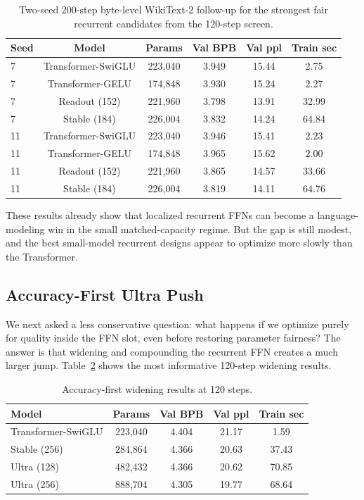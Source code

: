 \documentclass[11pt]{article}
\begin{document}
\begin{table}[t]
  \centering
  \small
  \caption{Two-seed 200-step byte-level WikiText-2 follow-up for the strongest
  fair recurrent candidates from the 120-step screen.}
  \label{tab:pilot200}
  \begin{tabular}{lccccc}
    \toprule
    Seed & Model & Params & Val BPB & Val ppl & Train sec \\
    \midrule
    7 & Transformer-SwiGLU & 223,040 & 3.949 & 15.44 & 2.75 \\
    7 & Transformer-GELU & 174,848 & 3.930 & 15.24 & 2.27 \\
    7 & Readout (152) & 221,960 & 3.798 & 13.91 & 32.99 \\
    7 & Stable (184) & 226,004 & 3.832 & 14.24 & 64.84 \\
    11 & Transformer-SwiGLU & 223,040 & 3.946 & 15.41 & 2.23 \\
    11 & Transformer-GELU & 174,848 & 3.965 & 15.62 & 2.00 \\
    11 & Readout (152) & 221,960 & 3.865 & 14.57 & 33.66 \\
    11 & Stable (184) & 226,004 & 3.819 & 14.11 & 64.76 \\
    \bottomrule
  \end{tabular}
\end{table}

These results already show that localized recurrent FFNs can become a
language-modeling win in the small matched-capacity regime. But the gap is
still modest, and the best small-model recurrent designs appear to optimize
more slowly than the Transformer.

\subsection{Accuracy-First Ultra Push}
We next asked a less conservative question: what happens if we optimize purely
for quality inside the FFN slot, even before restoring parameter fairness? The
answer is that widening and compounding the recurrent FFN creates a much larger
jump. Table~\ref{tab:ultra120} shows the most informative 120-step widening
results.

\begin{table}[t]
  \centering
  \caption{Accuracy-first widening results at 120 steps.}
  \label{tab:ultra120}
  \begin{tabular}{lcccc}
    \toprule
    Model & Params & Val BPB & Val ppl & Train sec \\
    \midrule
    Transformer-SwiGLU & 223,040 & 4.404 & 21.17 & 1.59 \\
    Stable (256) & 284,864 & 4.366 & 20.63 & 37.43 \\
    Ultra (128) & 482,432 & 4.366 & 20.62 & 70.85 \\
    Ultra (256) & 888,704 & 4.305 & 19.77 & 68.64 \\
    \bottomrule
  \end{tabular}
\end{table}
\end{document}
